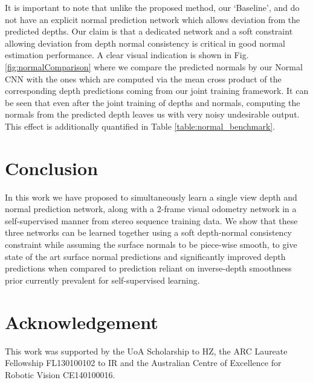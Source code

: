\documentclass[letterpaper, 10 pt, conference]{ieeeconf}
\begin{document}
It is important to note that unlike the proposed method, our `Baseline', \cite{yang2017depthnormal} and  \cite{yang2018lego} do not have an explicit normal prediction network which allows deviation from the predicted depths. 
Our claim is that a dedicated network and a soft constraint allowing deviation from depth normal consistency is critical in good normal estimation performance. 
A clear visual indication is shown in Fig. \ref{fig:normalComparison} where we compare the predicted normals  by our Normal CNN with the ones   which are computed via the mean cross product of the corresponding depth predictions coming from our joint training framework. 
It can be seen that even after the joint training of depths and normals, computing the normals from the predicted depth leaves us with very noisy undesirable output. This effect is additionally quantified in Table \ref{table:normal_benchmark}.
\section{Conclusion} \label{sec:conclusion}
In this work we have proposed to simultaneously learn a single view depth and normal prediction network, along with a 2-frame visual odometry network in a self-supervised manner from stereo sequence training data. We show that these three networks can be learned together using a soft depth-normal consistency constraint while assuming the surface normals to be piece-wise smooth, to give state of the art surface normal predictions and significantly improved depth predictions when compared to prediction reliant on inverse-depth smoothness prior currently prevalent for self-supervised learning.

\section{Acknowledgement} \label{sec:conclusion}
This work was supported by the UoA Scholarship to HZ, the ARC Laureate Fellowship FL130100102 to IR and the Australian Centre of Excellence for Robotic Vision CE140100016.
\end{document}
